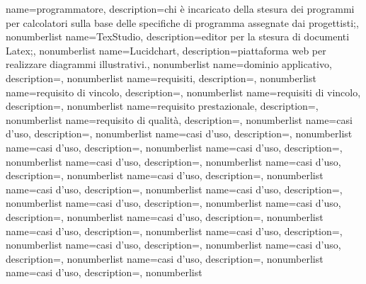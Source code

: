 {
name={programmatore},
description={chi è incaricato della stesura dei programmi per calcolatori sulla base delle specifiche di programma assegnate dai progettisti;},
nonumberlist 
}
{
name={TexStudio},
description={editor per la stesura di documenti Latex;},
nonumberlist 
}
{
name={Lucidchart},
description={piattaforma web per realizzare diagrammi illustrativi.},
nonumberlist 
}
{
	name={dominio applicativo},
	description={},
	nonumberlist 
}
{
name={requisiti},
description={},
nonumberlist 
}
{
name={requisito di vincolo},
description={},
nonumberlist 
}
{
name={requisiti di vincolo},
description={},
nonumberlist 
}
{
name={requisito prestazionale},
description={},
nonumberlist 
}
{
	name={requisito di qualità},
	description={},
	nonumberlist 
}
{
name={casi d'uso},
description={},
nonumberlist 
}
{
name={casi d'uso},
description={},
nonumberlist 
}
{
name={casi d'uso},
description={},
nonumberlist 
}
{
name={casi d'uso},
description={},
nonumberlist 
}
{
name={casi d'uso},
description={},
nonumberlist 
}
{
name={casi d'uso},
description={},
nonumberlist 
}
{
name={casi d'uso},
description={},
nonumberlist 
}
{
name={casi d'uso},
description={},
nonumberlist 
}
{
name={casi d'uso},
description={},
nonumberlist 
}
{
name={casi d'uso},
description={},
nonumberlist 
}
{
name={casi d'uso},
description={},
nonumberlist 
}
{
name={casi d'uso},
description={},
nonumberlist 
}
{
name={casi d'uso},
description={},
nonumberlist 
}
{
name={casi d'uso},
description={},
nonumberlist 
}
{
name={casi d'uso},
description={},
nonumberlist 
}
{
name={casi d'uso},
description={},
nonumberlist 
}
{
name={casi d'uso},
description={},
nonumberlist 
}
{
name={casi d'uso},
description={},
nonumberlist 
}